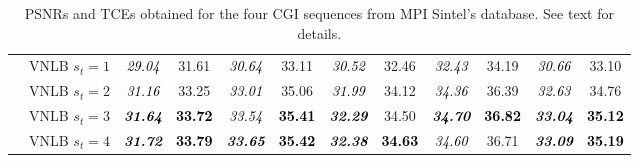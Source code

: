 \documentclass[10pt, a4paper]{article}
\newcommand{\best}[1]{#1}
\newcommand{\bsic}[1]{\textcolor{black}{\textit{#1}}}
\newcommand{\Bsic}[1]{\textcolor{black}{\textbf{\textit{#1}}}}
\newcommand{\Best}[1]{\textbf{\textcolor{black}{#1}}}
\begin{document}
\begin{table}[htp!]
\begin{center}
{\begin{tabular}{ c | l |c c | c c | c c | c c | c c}
			                      & VNLB   $s_t = 1$     & \bsic{29.04} &       31.61  & \bsic{30.64} &       33.11  & \bsic{30.52} &       32.46  & \bsic{32.43} &       34.19  & \bsic{30.66} &       33.10  \\
			                      & VNLB   $s_t = 2$     & \bsic{31.16} &       33.25  & \bsic{33.01} &       35.06  & \bsic{31.99} &       34.12  & \bsic{34.36} &       36.39  & \bsic{32.63} &       34.76  \\
			                      & VNLB   $s_t = 3$     & \Bsic{31.64} & \Best{33.72} & \bsic{33.54} & \Best{35.41} & \Bsic{32.29} & \best{34.50} & \Bsic{34.70} & \Best{36.82} & \Bsic{33.04} & \Best{35.12} \\
			                      & VNLB   $s_t = 4$     & \Bsic{31.72} & \Best{33.79} & \Bsic{33.65} & \Best{35.42} & \Bsic{32.38} & \Best{34.63} & \bsic{34.60} & \best{36.71} & \Bsic{33.09} & \Best{35.19} \\\hline
		\end{tabular}}
	\end{center}
	\caption{PSNRs and TCEs obtained for the four CGI sequences from MPI
	Sintel's database. See text for details.}
	\label{tab:sintel}
\end{table}
\end{document}
